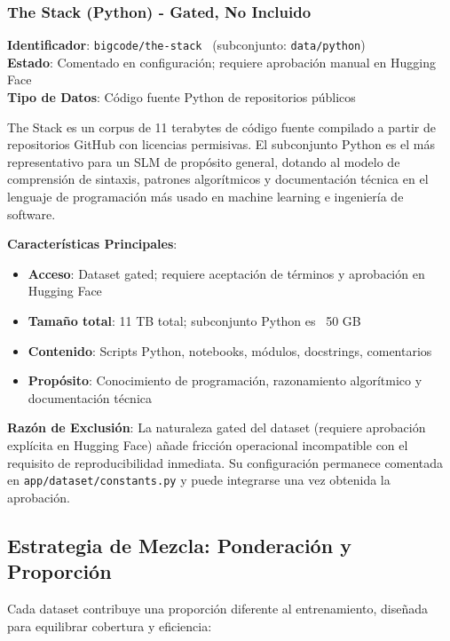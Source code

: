 \subsubsection{The Stack (Python) - Gated, No Incluido}
\label{subsec:the_stack}

\textbf{Identificador}: \texttt{bigcode/the-stack}~\cite{kocetkov2022stack} (subconjunto: \texttt{data/python}) \\
\textbf{Estado}: Comentado en configuración; requiere aprobación manual en Hugging Face \\
\textbf{Tipo de Datos}: Código fuente Python de repositorios públicos

The Stack es un corpus de 11 terabytes de código fuente compilado a partir de repositorios GitHub con licencias permisivas. El subconjunto Python es el más representativo para un SLM de propósito general, dotando al modelo de comprensión de sintaxis, patrones algorítmicos y documentación técnica en el lenguaje de programación más usado en machine learning e ingeniería de software.

\textbf{Características Principales}:
\begin{itemize}
    \item \textbf{Acceso}: Dataset gated; requiere aceptación de términos y aprobación en Hugging Face
    \item \textbf{Tamaño total}: 11 TB total; subconjunto Python es ~50 GB
    \item \textbf{Contenido}: Scripts Python, notebooks, módulos, docstrings, comentarios
    \item \textbf{Propósito}: Conocimiento de programación, razonamiento algorítmico y documentación técnica
\end{itemize}

\textbf{Razón de Exclusión}: La naturaleza gated del dataset (requiere aprobación explícita en Hugging Face) añade fricción operacional incompatible con el requisito de reproducibilidad inmediata. Su configuración permanece comentada en \texttt{app/dataset/constants.py} y puede integrarse una vez obtenida la aprobación.

\subsection{Estrategia de Mezcla: Ponderación y Proporción}
\label{subsec:estrategia_mezcla}

Cada dataset contribuye una proporción diferente al entrenamiento, diseñada para equilibrar cobertura y eficiencia:

